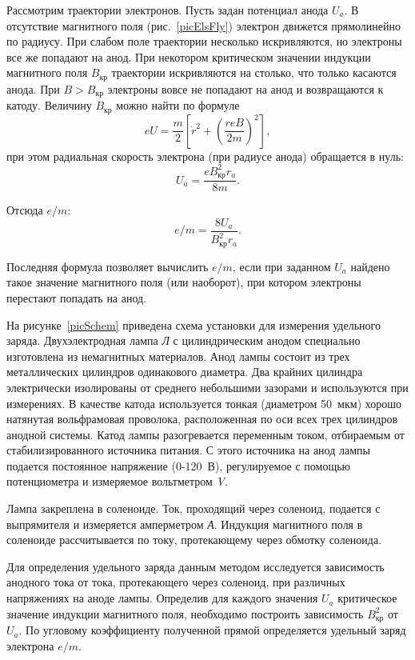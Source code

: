\documentclass[pscyr]{hedwork}
\begin{document}
  Рассмотрим траектории электронов. Пусть задан потенциал анода \( U_a \). В
  отсутствие магнитного поля (рис.~\ref{picElsFly}) электрон движется
  прямолинейно по радиусу. При слабом поле траектории несколько искривляются, но
  электроны все же попадают на анод. При некотором критическом значении индукции
  магнитного поля \( B_\text{кр} \) траектории искривляются на столько, что
  только касаются анода. При \( B > B_\text{кр} \) электроны вовсе не попадают
  на анод и возвращаются к катоду. Величину \( B_\text{кр} \) можно найти по
  формуле
  \[
    eU = \frac{m}{2}\left[ \dot{r}^2 + \left( \frac{reB}{2m} \right)^2 \right],
  \]
  при этом радиальная скорость электрона (при радиусе анода) обращается в нуль:
  \[
    U_a = \frac{e B_\text{кр}^2 r_a}{8m}.
  \]

  Отсюда \( e/m \):
  \[
    e/m = \frac{8U_a}{B_\text{кр}^2 r_a}.
  \]

  Последняя формула позволяет вычислить \( e/m \), если при заданном \( U_a \)
  найдено такое значение магнитного поля (или наоборот), при котором электроны
  перестают попадать на анод.

  На рисунке~\ref{picSchem} приведена схема установки для измерения удельного
  заряда. Двухэлектродная лампа \emph{Л} с цилиндрическим анодом специально
  изготовлена из немагнитных материалов. Анод лампы состоит из трех
  металлических цилиндров одинакового диаметра. Два крайних цилиндра
  электрически изолированы от среднего небольшими зазорами и используются при
  измерениях. В качестве катода используется тонкая (диаметром 50~мкм) хорошо
  натянутая вольфрамовая проволока, расположенная по оси всех трех цилиндров
  анодной системы. Катод лампы разогревается переменным током, отбираемым от
  стабилизированного источника питания. С этого источника на анод лампы подается
  постоянное напряжение (0-120~В), регулируемое с помощью потенциометра и
  измеряемое вольтметром \emph{V}.

  Лампа закреплена в соленоиде. Ток, проходящий через соленоид, подается с
  выпрямителя и измеряется амперметром \emph{А}. Индукция магнитного поля в
  соленоиде рассчитывается по току, протекающему через обмотку соленоида.

  Для определения удельного заряда данным методом исследуется зависимость
  анодного тока от тока, протекающего через соленоид, при различных напряжениях
  на аноде лампы. Определив для каждого значения \( U_a \) критическое значение
  индукции магнитного поля, необходимо построить зависимость \( B_\text{кр}^2 \)
  от \( U_a \). По угловому коэффициенту полученной прямой определяется удельный
  заряд электрона \( e/m \).
\end{document}
